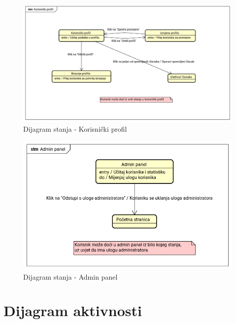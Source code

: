 \begin{figure}[H]
	\includegraphics[scale=0.4]{slike/dijagrami-stanja/korisnicki-profil.png}
	\centering
	\caption{Dijagram stanja - Korisnički profil}
	\label{fig:state_diagram_user}
\end{figure}

\begin{figure}[H]
	\includegraphics[scale=0.4]{slike/dijagrami-stanja/admin-panel.png}
	\centering
	\caption{Dijagram stanja - Admin panel}
	\label{fig:state_diagram_admin}
\end{figure}

\eject 


\section{Dijagram aktivnosti}

